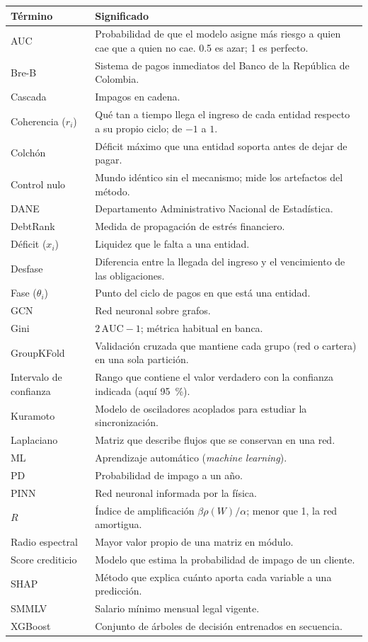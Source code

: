 \begin{longtable}{p{}p{}}
\toprule
\textbf{Término} & \textbf{Significado} \\
\midrule
\endhead
AUC & Probabilidad de que el modelo asigne más riesgo a quien cae que a quien no cae.
0.5 es azar; 1 es perfecto. \\
Bre-B & Sistema de pagos inmediatos del Banco de la República de Colombia. \\
Cascada & Impagos en cadena. \\
Coherencia ($r_i$) & Qué tan a tiempo llega el ingreso de cada entidad respecto a su
propio ciclo; de $-1$ a $1$. \\
Colchón & Déficit máximo que una entidad soporta antes de dejar de pagar. \\
Control nulo & Mundo idéntico sin el mecanismo; mide los artefactos del método. \\
DANE & Departamento Administrativo Nacional de Estadística. \\
DebtRank & Medida de propagación de estrés financiero. \\
Déficit ($x_i$) & Liquidez que le falta a una entidad. \\
Desfase & Diferencia entre la llegada del ingreso y el vencimiento de las
obligaciones. \\
Fase ($\theta_i$) & Punto del ciclo de pagos en que está una entidad. \\
GCN & Red neuronal sobre grafos. \\
Gini & $2\,\mathrm{AUC}-1$; métrica habitual en banca. \\
GroupKFold & Validación cruzada que mantiene cada grupo (red o cartera) en una sola
partición. \\
Intervalo de confianza & Rango que contiene el valor verdadero con la confianza
indicada (aquí 95~\%). \\
Kuramoto & Modelo de osciladores acoplados para estudiar la sincronización. \\
Laplaciano & Matriz que describe flujos que se conservan en una red. \\
ML & Aprendizaje automático (\emph{machine learning}). \\
PD & Probabilidad de impago a un año. \\
PINN & Red neuronal informada por la física. \\
$R$ & Índice de amplificación $\beta\rho(W)/\alpha$; menor que 1, la red amortigua. \\
Radio espectral & Mayor valor propio de una matriz en módulo. \\
Score crediticio & Modelo que estima la probabilidad de impago de un cliente. \\
SHAP & Método que explica cuánto aporta cada variable a una predicción. \\
SMMLV & Salario mínimo mensual legal vigente. \\
XGBoost & Conjunto de árboles de decisión entrenados en secuencia. \\
\bottomrule
\end{longtable}

